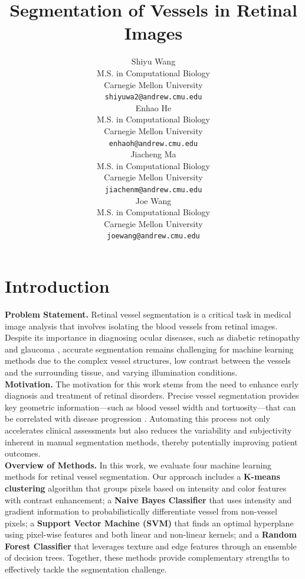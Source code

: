 \documentclass[final]{article}
\title{Segmentation of Vessels in Retinal Images}
\author{%
    Shiyu Wang \\
    M.S. in Computational Biology \\
    Carnegie Mellon University \\
    \texttt{shiyuwa2@andrew.cmu.edu} \\
    \And
    Enhao He \\
    M.S. in Computational Biology \\
    Carnegie Mellon University \\
    \texttt{enhaoh@andrew.cmu.edu} \\
    \AND
    Jiacheng Ma \\
    M.S. in Computational Biology \\
    Carnegie Mellon University \\
    \texttt{jiachenm@andrew.cmu.edu} \\
    \And
    Joe Wang \\
    M.S. in Computational Biology \\
    Carnegie Mellon University \\
    \texttt{joewang@andrew.cmu.edu} \\
}
\begin{document}
\maketitle

\vspace{-0.5cm}

\section{Introduction}
\textbf{Problem Statement.} Retinal vessel segmentation is a critical task in medical image analysis that involves isolating the blood vessels from retinal images. Despite its importance in diagnosing ocular diseases, such as diabetic retinopathy and glaucoma \citep{1}, accurate segmentation remains challenging for machine learning methods due to the complex vessel structures, low contrast between the vessels and the surrounding tissue, and varying illumination conditions. \\
\textbf{Motivation.} The motivation for this work stems from the need to enhance early diagnosis and treatment of retinal disorders. Precise vessel segmentation provides key geometric information—such as blood vessel width and tortuosity—that can be correlated with disease progression \citep{review2022}. Automating this process not only accelerates clinical assessments but also reduces the variability and subjectivity inherent in manual segmentation methods, thereby potentially improving patient outcomes. \\
\textbf{Overview of Methods.} In this work, we evaluate four machine learning methods for retinal vessel segmentation. Our approach includes a \textbf{K-means clustering} algorithm that groups pixels based on intensity and color features with contrast enhancement; a \textbf{Naive Bayes Classifier} that uses intensity and gradient information to probabilistically differentiate vessel from non-vessel pixels; a \textbf{Support Vector Machine (SVM)} that finds an optimal hyperplane using pixel-wise features and both linear and non-linear kernels; and a \textbf{Random Forest Classifier} that leverages texture and edge features through an ensemble of decision trees. Together, these methods provide complementary strengths to effectively tackle the segmentation challenge. \\
\end{document}
